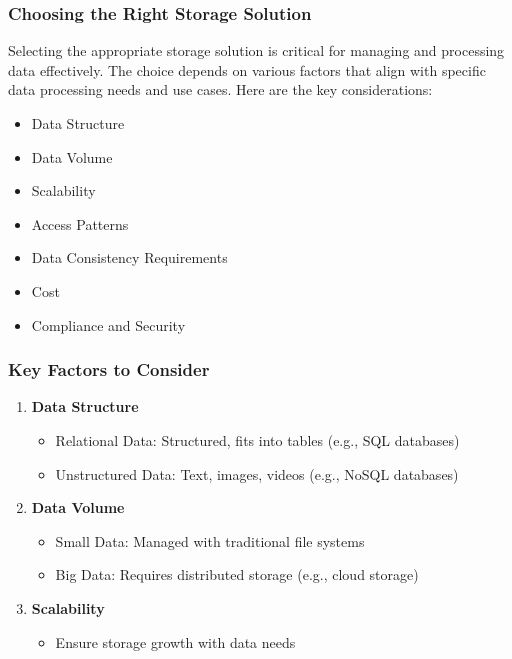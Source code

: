 \documentclass[aspectratio=169]{beamer}
\begin{document}
\begin{frame}[fragile]
    \frametitle{Choosing the Right Storage Solution}
    Selecting the appropriate storage solution is critical for managing and processing data effectively. The choice depends on various factors that align with specific data processing needs and use cases. Here are the key considerations:

    \begin{itemize}
        \item Data Structure
        \item Data Volume
        \item Scalability
        \item Access Patterns
        \item Data Consistency Requirements
        \item Cost
        \item Compliance and Security
    \end{itemize}
\end{frame}

\begin{frame}[fragile]
    \frametitle{Key Factors to Consider}
    \begin{enumerate}
        \item \textbf{Data Structure}
            \begin{itemize}
                \item Relational Data: Structured, fits into tables (e.g., SQL databases)
                \item Unstructured Data: Text, images, videos (e.g., NoSQL databases)
            \end{itemize}

        \item \textbf{Data Volume}
            \begin{itemize}
                \item Small Data: Managed with traditional file systems
                \item Big Data: Requires distributed storage (e.g., cloud storage)
            \end{itemize}

        \item \textbf{Scalability}
            \begin{itemize}
                \item Ensure storage growth with data needs
            \end{itemize}
    \end{enumerate}
\end{frame}
\end{document}
